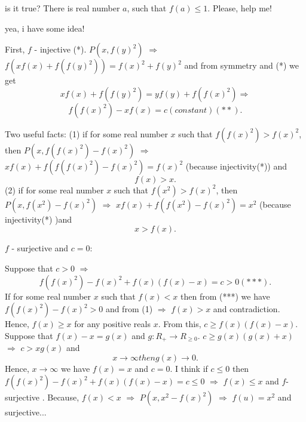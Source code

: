 \begin{solution}
	is it true?  There is  real number  $a$, such that  $f(a)\le 1$.
Please, help me!
\end{solution}



\begin{solution}
	yea, i have  some idea!

First,  $f$ - injective (*).
$ P(x, f(y)^2) $ $ \Longrightarrow $  $ f(xf(x)+f(f(y)^2))=f(x)^2+f(y)^2 $ and
from symmetry and  (*) we get  \[ xf(x)+f(f(y)^2)=yf(y)+f(f(x)^2)  \Rightarrow \]
\[ f(f(x)^2)-xf(x)=c (constant) (**).\]
  
          Two useful facts: 
  (1) if  for some real number $x$ such that $ f(f(x)^2) > f(x)^2 $,  then  $P(x, f(f(x)^2)-f(x)^2)$ $ \Rightarrow $ $ xf(x)+f(f(f(x)^2)-f(x)^2)=f(x)^2$ (because injectivity(*)) and \[ f(x)>x .\] 
  (2) if for some  real number  $x$ such that  $f(x^2)>f(x)^2$,  then  $P(x, f(x^2)-f(x)^2)$ $ \Rightarrow $  $ xf(x)+f(f(x^2)-f(x)^2)=x^2 $ (because injectivity(*) )and  \[ x>f(x) .\]
 
$f$ - surjective and $c=0$:

Suppose that  $c>0$ $ \Rightarrow $ \[ f(f(x)^2)-f(x)^2+f(x)(f(x)-x) = c >0 (***).\] 
If for some real number $x$ such that $f(x)<x$  then from (***) we have $f(f(x)^2)-f(x)^2>0$ and from (1) $ \Rightarrow $   $f(x)>x$ and contradiction.  Hence,  $f(x)\ge x$ for any positive reals  $x$.  From this,  $c\ge f(x)(f(x)-x) $. Suppose that $f(x)-x=g(x)$ and $g:R_{+}\rightarrow R_{\ge 0}$.
$c\ge g(x)(g(x)+x) $ $ \Rightarrow $ $c>xg(x)$ and \[ x\rightarrow \infty then  g(x)\rightarrow  0 .\]
Hence, $ x\rightarrow \infty $  we have $f(x)=x$ and $c=0$.
I think  if $c\le 0$ then $f(f(x)^2)-f(x)^2 +f(x)(f(x)-x)=c\le 0$ $ \Rightarrow $ $f(x)\le x$ and $f$-surjective .
Because, $f(x)< x$ $ \Rightarrow $  $P(x,x^2-f(x)^2)$ $ \Rightarrow $ $f(u)=x^2$ and surjective...
\end{solution}



